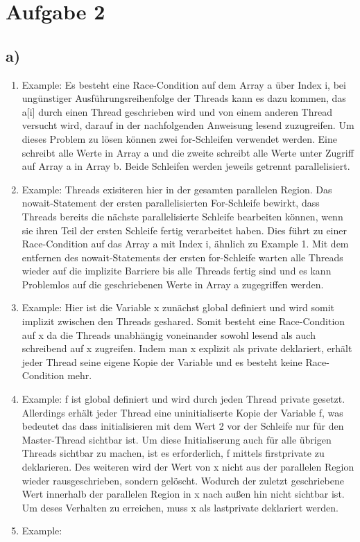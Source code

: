 \documentclass{article}
\begin{document}
    \section{Aufgabe 2}
    	\subsection{a)}
		\begin{enumerate}
			\item Example: Es besteht eine Race-Condition auf dem Array a über Index i,
				bei ungünstiger Ausführungsreihenfolge der Threads kann es dazu kommen,
				das a[i] durch einen Thread geschrieben wird und von einem anderen Thread versucht wird, darauf in der nachfolgenden Anweisung lesend zuzugreifen.
				Um dieses Problem zu lösen können zwei for-Schleifen verwendet werden.
				Eine schreibt alle Werte in Array a und die zweite schreibt alle Werte unter Zugriff auf Array a in Array b. 
				Beide Schleifen werden jeweils getrennt parallelisiert.
			\item Example: Threads exisiteren hier in der gesamten parallelen Region.
				Das nowait-Statement der ersten parallelisierten For-Schleife bewirkt, dass Threads bereits die nächste parallelisierte Schleife bearbeiten können, wenn sie ihren Teil der ersten Schleife fertig verarbeitet haben.
				Dies führt zu einer Race-Condition auf das Array a mit Index i, ähnlich zu Example 1.
				Mit dem entfernen des nowait-Statements der ersten for-Schleife warten alle Threads wieder auf die implizite Barriere bis alle Threads fertig sind und es kann Problemlos auf die geschriebenen Werte in Array a zugegriffen werden.
			\item Example: Hier ist die Variable x zunächst global definiert und wird somit implizit zwischen den Threads geshared. 
				Somit besteht eine Race-Condition auf x da die Threads unabhängig voneinander sowohl lesend als auch schreibend auf x zugreifen.
				Indem man x explizit als private deklariert, erhält jeder Thread seine eigene Kopie der Variable und es besteht keine Race-Condition mehr.
			\item Example: f ist global definiert und wird durch jeden Thread private gesetzt. 
				Allerdings erhält jeder Thread eine uninitialiserte Kopie der Variable f, was bedeutet das dass initialisieren mit dem Wert 2 vor der Schleife nur für den Master-Thread sichtbar ist.
				Um diese Initialiserung auch für alle übrigen Threads sichtbar zu machen, ist es erforderlich, f mittels firstprivate zu deklarieren.
				Des weiteren wird der Wert von x nicht aus der parallelen Region wieder rausgeschrieben, sondern gelöscht. 
				Wodurch der zuletzt geschriebene Wert innerhalb der parallelen Region in x nach außen hin nicht sichtbar ist.
				Um deses Verhalten zu erreichen, muss x als lastprivate deklariert werden.
			\item Example:

		\end{enumerate}
\end{document}
